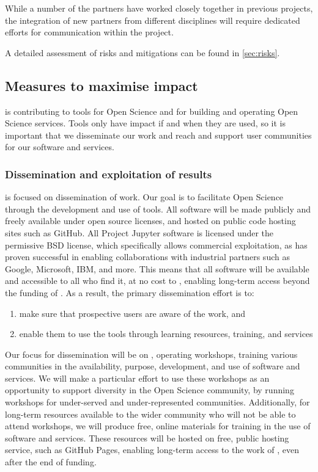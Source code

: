 While a number of the partners have worked closely together in previous projects,
the integration of new partners from different disciplines will require
dedicated efforts for communication within the project.

A detailed assessment of risks and mitigations can be found in \ref{sec:risks}.

\subsection{Measures to maximise impact}

\TheProject is contributing to tools for Open Science and for building and operating Open Science services.
Tools only have impact if and when they are used,
so it is important that we disseminate our work
and reach and support user communities for our software and services.

\subsubsection{Dissemination and exploitation of results}

 is focused on dissemination of \TheProject work.
Our goal is to facilitate Open Science through the development and use of tools.
All \TheProject software will be made publicly and freely available under open source licenses, and hosted on public code hosting sites such as GitHub.
All Project Jupyter software is licensed under the permissive BSD license,
which specifically allows commercial exploitation,
as has proven successful in enabling collaborations with industrial partners
such as Google, Microsoft, IBM, and more.
This means that all \TheProject software will be available and accessible to all who find it,
at no cost to \TheProject,
enabling long-term access beyond the funding of \TheProject.
As a result, the primary dissemination effort is to:

\begin{enumerate}
  \item make sure that prospective users are aware of the work, and
  \item enable them to use the tools through learning resources, training, and services
\end{enumerate}

Our focus for dissemination will be on ,
operating workshops, training various communities in the availability,
purpose, development, and use of \TheProject software and services.
We will make a particular effort to use these workshops as an opportunity
to support diversity in the Open Science community,
by running workshops for under-served and under-represented communities.
Additionally, for long-term resources available to the wider community
who will not be able to attend workshops,
we will produce free, online materials for training in the use of \TheProject
software and services.
These resources will be hosted on free, public hosting service,
such as GitHub Pages,
enabling long-term access to the work of \TheProject,
even after the end of funding.

